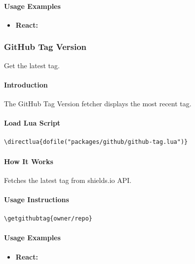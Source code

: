 \documentclass{article}
\begin{document}
\paragraph{Usage Examples}

\begin{itemize}
    \item \textbf{React:} 
\end{itemize}

\subsubsection{GitHub Tag Version}

Get the latest tag.

\paragraph{Introduction}

The GitHub Tag Version fetcher displays the most recent tag.

\paragraph{Load Lua Script}

\begin{verbatim}
\directlua{dofile("packages/github/github-tag.lua")}
\end{verbatim}

\paragraph{How It Works}

Fetches the latest tag from shields.io API.

\paragraph{Usage Instructions}

\begin{verbatim}
\getgithubtag{owner/repo}
\end{verbatim}

\paragraph{Usage Examples}

\begin{itemize}
    \item \textbf{React:} 
\end{itemize}
\end{document}
